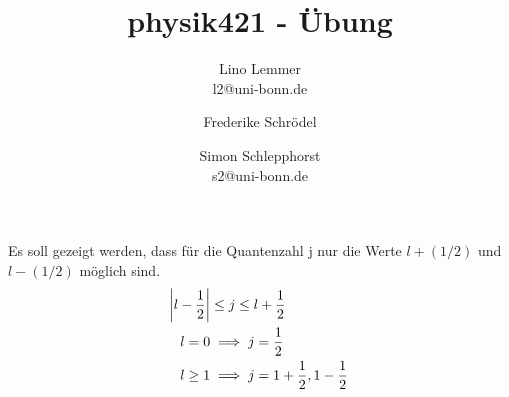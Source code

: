 

\setcounter{thezettel}{10}
\renewcommand\thesection{\arabic{thezettel}.\arabic{section}}



\title{physik421 - Übung }
\author{Lino Lemmer \\ \small{l2@uni-bonn.de} \and Frederike Schrödel \and Simon Schlepphorst\\ \small{s2@uni-bonn.de}}


\maketitle

\section{}

\section{}

\section{}

\section{}

\subsection{}
Es soll gezeigt werden, dass für die Quantenzahl j nur die Werte $l + (1/2)$ und
$l - (1/2)$ möglich sind.
\begin{align*}
 \abs{l-\frac12} &\leq j \leq l + \frac12\\
 l = 0 &\implies j = \frac12\\
 l \geq 1 &\implies j = 1 + \frac12, 1 -\frac12
\end{align*}

